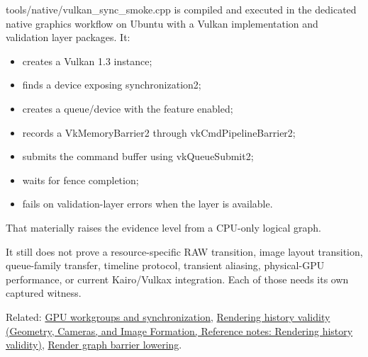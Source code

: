 tools/native/vulkan\_sync\_smoke.cpp is compiled and executed in the dedicated native graphics workflow on Ubuntu with a Vulkan implementation and validation layer packages. It:

\begin{itemize}
\tightlist
\item
  creates a Vulkan 1.3 instance;
\item
  finds a device exposing synchronization2;
\item
  creates a queue/device with the feature enabled;
\item
  records a VkMemoryBarrier2 through vkCmdPipelineBarrier2;
\item
  submits the command buffer using vkQueueSubmit2;
\item
  waits for fence completion;
\item
  fails on validation-layer errors when the layer is available.
\end{itemize}

That materially raises the evidence level from a CPU-only logical graph.

It still does not prove a resource-specific RAW transition, image layout transition, queue-family transfer, timeline protocol, transient aliasing, physical-GPU performance, or current Kairo/Vulkax integration. Each of those needs its own captured witness.

Related: \hyperref[appendix-f662b5b1773b]{GPU workgroups and synchronization}, \href{../03-Geometry-Cameras-and-Image-Formation/main.pdf\#nameddest=appendix-2e7e9fd28a2c}{Rendering history validity (Geometry, Cameras, and Image Formation, Reference notes: Rendering history validity)}, \hyperref[appendix-0fc95374cb7e]{Render graph barrier lowering}.
